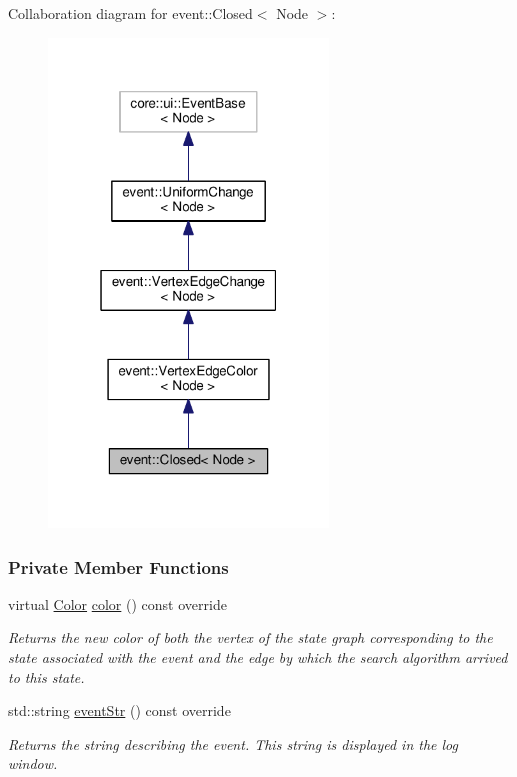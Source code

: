 Collaboration diagram for event\+:\+:Closed$<$ Node $>$\+:\nopagebreak
\begin{figure}[H]
\begin{center}
\leavevmode
\includegraphics[width=211pt]{structevent_1_1Closed__coll__graph}
\end{center}
\end{figure}
\subsubsection*{Private Member Functions}
\begin{DoxyCompactItemize}
\item 
virtual \hyperlink{colors_8h_ab87bacfdad76e61b9412d7124be44c1c}{Color} \hyperlink{structevent_1_1Closed_a9476c4920a50603a2c665cd52af8a506}{color} () const override
\begin{DoxyCompactList}\small\item\em Returns the new color of both the vertex of the state graph corresponding to the state associated with the event and the edge by which the search algorithm arrived to this state. \end{DoxyCompactList}\item 
std\+::string \hyperlink{structevent_1_1Closed_a8dd26d47a83b47fb40a0106656c70c54}{event\+Str} () const override
\begin{DoxyCompactList}\small\item\em Returns the string describing the event. This string is displayed in the log window. \end{DoxyCompactList}\end{DoxyCompactItemize}
